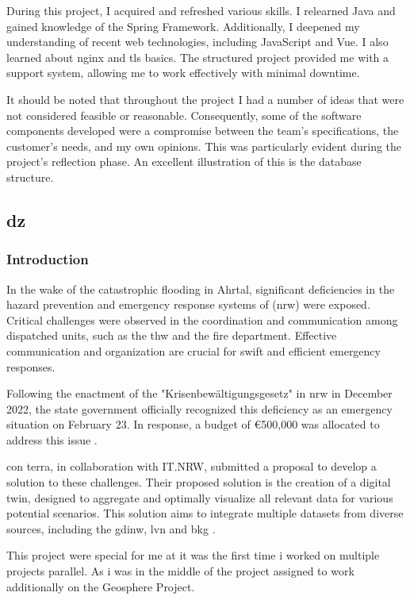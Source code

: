 \documentclass[11pt, titlepage, a4paper]{article}
\begin{document}
During this project, I acquired and refreshed various skills. I relearned Java and gained knowledge of the Spring Framework. Additionally, I deepened my understanding of recent web technologies, including JavaScript and  Vue. I also learned about \Gls{nginx} and \gls{tls} basics.
The structured project provided me with a support system, allowing me to work effectively with minimal downtime.

It should be noted that throughout the project I had a number of ideas that were not considered feasible or reasonable. Consequently, some of the software components developed were a compromise between the team's specifications, the customer's needs, and my own opinions. This was particularly evident during the project's reflection phase. An excellent illustration of this is the database structure.
\subsection{\gls{dz}}
\subsubsection{Introduction}
In the wake of the catastrophic flooding in Ahrtal, significant deficiencies in the hazard prevention and emergency response systems of (\gls {nrw}) were exposed. Critical challenges were observed in the coordination and communication among dispatched units, such as the  \gls{thw} and the fire department. \cite{anna-laraweidingerAhrtalHochwasser2024} Effective communication and organization are crucial for swift and efficient emergency responses.

Following the enactment of the "Krisenbewältigungsgesetz" in \gls {nrw} in December 2022, the state government officially recognized this deficiency as an emergency situation on February 23. In response, a budget of €500,000 was allocated to address this issue \cite{landesregierungnordrhein-westfalenGesetzZurErrichtung2022}.

con terra, in collaboration with IT.NRW, submitted a proposal to develop a solution to these challenges. Their proposed solution is the creation of a digital twin, designed to aggregate and optimally visualize all relevant data for various potential scenarios. This solution aims to integrate multiple datasets from diverse sources, including the \gls{gdinw}, \gls{lvn} and \gls{bkg} \cite{caffier14GDIForumNordrheinWestfalen}.

This project were special for me at it was the first time i worked on multiple projects parallel. As i was in the middle of the project assigned to work additionally on the Geosphere Project.
\end{document}
